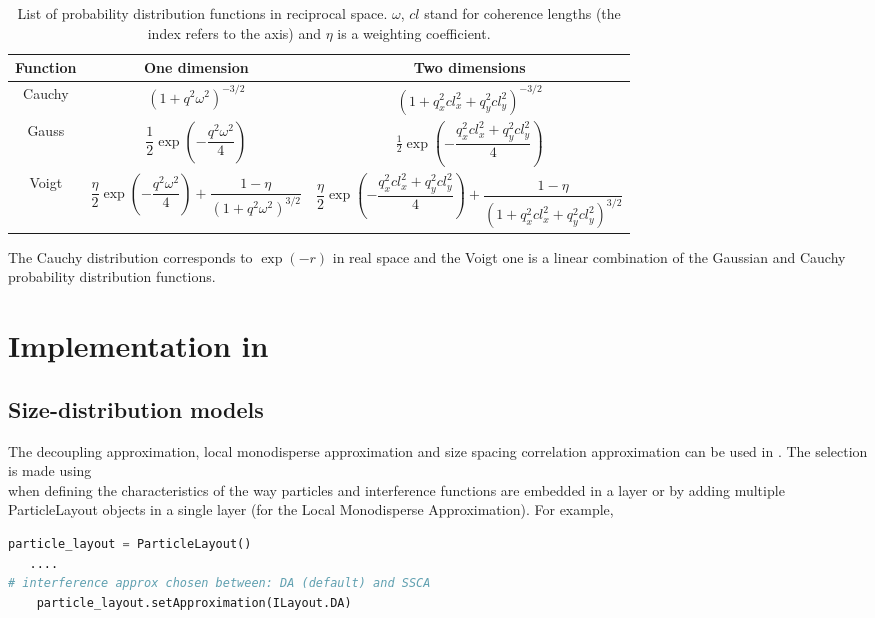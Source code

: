 \begin{table}
\centering
\begin{tabular}{ccc}
\hline 
Function & One dimension & Two dimensions\\
\hline 
Cauchy & $(1+q^2\omega^2)^{-3/2}$ & $(1 + q_x^2 cl_x^2 + q_y^2 cl_y^2)^{-3/2}$ \\
Gauss & $\dfrac{1}{2}\exp(-\dfrac{q^2\omega^2}{4})$ & $\frac{1}{2}\exp\left(-\dfrac{q_x^2 cl_x^2+ q_y^2cl_y^2}{4}\right)$ \\
Voigt & $\dfrac{\eta}{2} \exp\left(-\dfrac{q^2\omega^2}{4}\right) + \dfrac{1 - \eta}{(1 + q^2\omega^2)^{3/2}}$ & $\dfrac{\eta}{2} \exp\left(-\dfrac{q_x^2 cl_x^2+ q_y^2cl_y^2}{4}\right)+ \dfrac{1 - \eta}{(1 + q_x^2 cl_x^2+ q_y^2cl_y^2)^{3/2}}$ \\
\hline
\end{tabular}
\caption{List of probability distribution functions in reciprocal space. $\omega$, $cl$ stand for coherence lengths (the index refers to the axis) and  $\eta$ is a weighting coefficient.}
\label{table:pdf}
\end{table}

The Cauchy distribution corresponds to $\exp(-r)$ in real space and the Voigt one  is a linear combination of the Gaussian and Cauchy probability distribution functions.

\section{Implementation in \BornAgain}
\subsection{Size-distribution models}
The decoupling approximation, local monodisperse approximation and size spacing correlation approximation can be used in \BornAgain.
The selection is made using\\  when defining the characteristics of the way particles and interference functions are embedded in a layer or by adding multiple ParticleLayout objects in a single layer (for the Local Monodisperse Approximation).  For example,
\begin{lstlisting}[language=python, style=eclipseboxed,numbers=none,nolol]
    particle_layout = ParticleLayout()
   ....
# interference approx chosen between: DA (default) and SSCA
    particle_layout.setApproximation(ILayout.DA)
\end{lstlisting}

